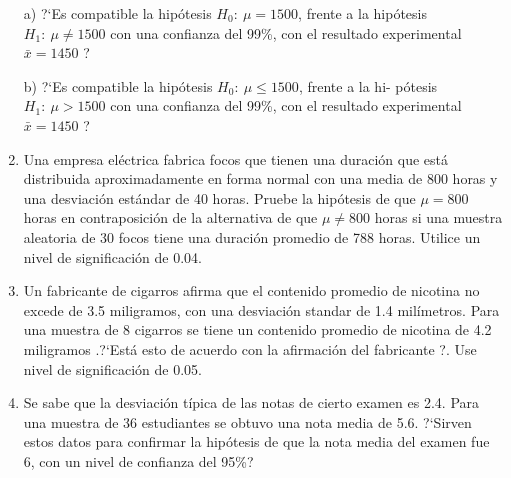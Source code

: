 \begin{adjustwidth}{20pt}{10pt}
\begin{enumerate}[PB. 1. ]
a) ?`Es compatible la hipótesis $H_0:\ \mu=1500$, frente a la hipótesis $H_1: \ \mu\neq 1500$ con una confianza del 99\%, con el resultado experimental  $\bar x = 1 4 5 0$ ?

b) ?`Es compatible la hipótesis $H_0: \ \mu \le 1500$, frente a la hi- pótesis $H_1:\ \mu > 1500$ con una confianza del 99\%, con el resultado experimental $\bar x = 1 4 5 0$ ?

\hspace{-15mm}\vspace{1cm}



\item Una empresa eléctrica fabrica focos que tienen una duración que está distribuida aproximadamente en forma normal con una media de 800 horas y una desviación estándar de 40 horas. Pruebe la hipótesis de que $\mu= 800$ horas en contraposición de la alternativa de que $\mu \neq 800$  horas si una muestra aleatoria de 30 focos tiene una duración promedio de 788 horas. Utilice un nivel de significación de 0.04. 

\hspace{-15mm}\vspace{1cm}

\item Un fabricante de cigarros afirma que el contenido promedio de nicotina no excede de 3.5 miligramos,  con una desviación standar de 1.4 milímetros. Para una muestra de 8 cigarros se tiene un contenido promedio de nicotina de 4.2 miligramos .?`Está esto de acuerdo con la afirmación del fabricante ?. Use nivel de significación de 0.05. 

\hspace{-15mm}\vspace{1cm}

\item Se sabe que la desviación típica de las notas de cierto examen es 2.4. Para una muestra de 36 estudiantes se obtuvo una nota media de 5.6. ?`Sirven estos datos para confirmar la hipótesis de que la nota media del examen fue 6, con un nivel de confianza del 95\%?

\hspace{-15mm}\vspace{1cm}


\end{enumerate}
\end{adjustwidth}
